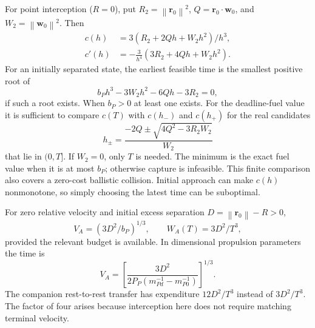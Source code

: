 \documentclass[journal,a4paper]{IEEEtran}
\newcommand{\norm}[1]{\left\|#1\right\|}
\begin{document}
For point interception ($R=0$), put $R_2=\norm{\mathbf r_0}^2$, $Q=\mathbf r_0\cdot\mathbf w_0$, and $W_2=\norm{\mathbf w_0}^2$. Then
\begin{align}
 c(h)&=3(R_2+2Qh+W_2h^2)/h^3,\nonumber\\
 c'(h)&=-\frac{3}{h^4}(3R_2+4Qh+W_2h^2).
 \label{eq:ballisticderivative}
\end{align}
For an initially separated state, the earliest feasible time is the smallest positive root of
\begin{equation}
 b_Ph^3-3W_2h^2-6Qh-3R_2=0,
 \label{eq:ballisticcubic}
\end{equation}
if such a root exists. When $b_P>0$ at least one exists. For the deadline-fuel value it is sufficient to compare $c(T)$ with $c(h_-)$ and $c(h_+)$ for the real candidates
\begin{equation}
 h_\pm=\frac{-2Q\pm\sqrt{4Q^2-3R_2W_2}}{W_2}
 \label{eq:ballisticstationary}
\end{equation}
that lie in $(0,T]$. If $W_2=0$, only $T$ is needed. The minimum is the exact fuel value when it is at most $b_P$; otherwise capture is infeasible. This finite comparison also covers a zero-cost ballistic collision. Initial approach can make $c(h)$ nonmonotone, so simply choosing the latest time can be suboptimal.

For zero relative velocity and initial excess separation $D=\norm{\mathbf r_0}-R>0$,
\begin{equation}
 \boxed{V_A=(3D^2/b_P)^{1/3},\qquad
 W_A(T)=3D^2/T^3,}
 \label{eq:restintercept}
\end{equation}
provided the relevant budget is available. In dimensional propulsion parameters the time is
\begin{equation}
 V_A=\left[\frac{3D^2}{2P_P(m_{Pd}^{-1}-m_{P0}^{-1})}\right]^{1/3}.
\end{equation}
The companion rest-to-rest transfer has expenditure $12D^2/T^3$ instead of $3D^2/T^3$. The factor of four arises because interception here does not require matching terminal velocity.
\end{document}

